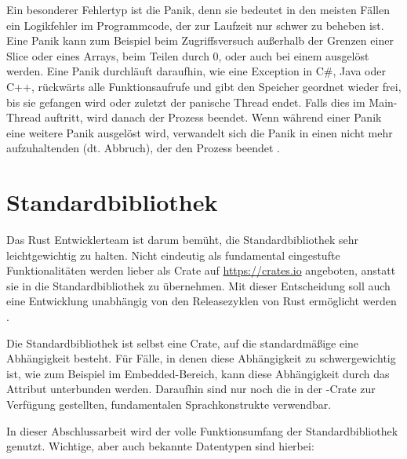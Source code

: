 \label{rust:panic}
Ein besonderer Fehlertyp ist die Panik, denn sie bedeutet in den meisten Fällen ein Logikfehler im Programmcode, der zur Laufzeit nur schwer zu beheben ist.
Eine Panik kann zum Beispiel beim Zugriffsversuch außerhalb der Grenzen einer Slice oder eines Arrays, beim Teilen durch 0, oder auch bei einem  ausgelöst werden.
Eine Panik durchläuft daraufhin, wie eine Exception in C\#, Java oder C++, rückwärts alle Funktionsaufrufe und gibt den Speicher geordnet wieder frei, bis sie gefangen wird oder zuletzt der panische Thread endet.
Falls dies im Main-Thread auftritt, wird danach der Prozess beendet.
Wenn während einer Panik eine weitere Panik ausgelöst wird, verwandelt sich die Panik in einen nicht mehr aufzuhaltenden  (dt. Abbruch), der den Prozess beendet \cite[145-147]{rust:orly_programming}.




\section{Standardbibliothek}
\label{rust:stdlib}

Das Rust Entwicklerteam ist darum bemüht, die Standardbibliothek sehr leichtgewichtig zu halten.
Nicht eindeutig als fundamental eingestufte Funktionalitäten werden lieber als Crate auf \url{https://crates.io} angeboten, anstatt sie in die Standardbibliothek zu übernehmen. 
Mit dieser Entscheidung soll auch eine Entwicklung unabhängig von den Releasezyklen von Rust ermöglicht werden \cite{rust:internals:1242}.

Die Standardbibliothek ist selbst eine Crate, auf die standardmäßige eine Abhängigkeit besteht.
Für Fälle, in denen diese Abhängigkeit zu schwergewichtig ist, wie zum Beispiel im Embedded-Bereich, kann diese Abhängigkeit durch das Attribut \rustcinline{#![no_std]} unterbunden werden.
Daraufhin sind nur noch die in der -Crate zur Verfügung gestellten, fundamentalen Sprachkonstrukte verwendbar.

In dieser Abschlussarbeit wird der volle Funktionsumfang der Standardbibliothek genutzt.
Wichtige, aber auch bekannte Datentypen sind hierbei:

